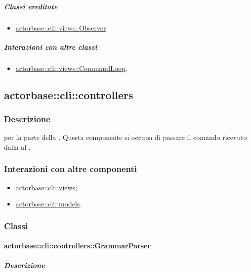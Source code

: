 \documentclass{scalatekids-article}
\begin{document}
\subparagraph{Classi ereditate}

\begin{itemize}
\item \hyperref[sec:actorbase::cli::views::Observer]{actorbase::cli::views::Observer}.
\end{itemize}

\subparagraph{Interazioni con altre classi}

\begin{itemize}
\item \hyperref[sec:actorbase::cli::views::CommandLoop]{actorbase::cli::views::CommandLoop}.
\end{itemize}

\subsection{actorbase::cli::controllers}
\label{sec:actorbase::cli::controllers}

\subsubsection{Descrizione}

 per la parte  della . Questa
componente si occupa di passare il comando ricevuto dalla  al
.

\subsubsection{Interazioni con altre componenti}

\begin{itemize}
\item \hyperref[sec:actorbase::cli::views]{actorbase::cli::views};
\item \hyperref[sec:actorbase::cli::models]{actorbase::cli::models}.
\end{itemize}

\subsubsection{Classi}

\paragraph{actorbase::cli::controllers::GrammarParser}
\label{sec:actorbase::cli::controllers::GrammarParser}

\subparagraph{Descrizione}
\end{document}
